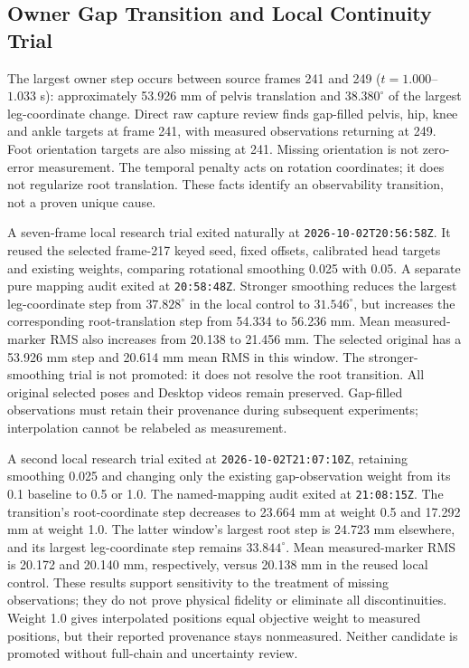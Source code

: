 \documentclass[11pt,a4paper]{article}
\begin{document}
\subsection{Owner Gap Transition and Local Continuity Trial}
The largest owner step occurs between source frames 241 and 249
($t=1.000$--$1.033$ s): approximately 53.926 mm of pelvis translation
and $38.380^\circ$ of the largest leg-coordinate change. Direct raw
capture review finds gap-filled pelvis, hip, knee and ankle targets
at frame 241, with measured observations returning at 249. Foot
orientation targets are also missing at 241. Missing orientation is
not zero-error measurement. The temporal penalty acts on rotation
coordinates; it does not regularize root translation. These facts
identify an observability transition, not a proven unique cause.

A seven-frame local research trial exited naturally at
\texttt{2026-10-02T20:56:58Z}. It reused the selected frame-217 keyed
seed, fixed offsets, calibrated head targets and existing weights,
comparing rotational smoothing 0.025 with 0.05. A separate pure mapping
audit exited at \texttt{20:58:48Z}. Stronger smoothing reduces the
largest leg-coordinate step from $37.828^\circ$ in the local control
to $31.546^\circ$, but increases the corresponding root-translation
step from 54.334 to 56.236 mm. Mean measured-marker RMS also increases
from 20.138 to 21.456 mm. The selected original has a 53.926 mm step
and 20.614 mm mean RMS in this window. The stronger-smoothing trial
is not promoted: it does not resolve the root transition. All original
selected poses and Desktop videos remain preserved. Gap-filled
observations must retain their provenance during subsequent experiments;
interpolation cannot be relabeled as measurement.

A second local research trial exited at
\texttt{2026-10-02T21:07:10Z}, retaining smoothing 0.025 and changing
only the existing gap-observation weight from its 0.1 baseline to
0.5 or 1.0. The named-mapping audit exited at \texttt{21:08:15Z}.
The transition's root-coordinate step decreases to 23.664 mm at weight
0.5 and 17.292 mm at weight 1.0. The latter window's largest root step
is 24.723 mm elsewhere, and its largest leg-coordinate step remains
$33.844^\circ$. Mean measured-marker RMS is 20.172 and 20.140 mm,
respectively, versus 20.138 mm in the reused local control. These
results support sensitivity to the treatment of missing observations;
they do not prove physical fidelity or eliminate all discontinuities.
Weight 1.0 gives interpolated positions equal objective weight to
measured positions, but their reported provenance stays nonmeasured.
Neither candidate is promoted without full-chain and uncertainty review.
\end{document}
